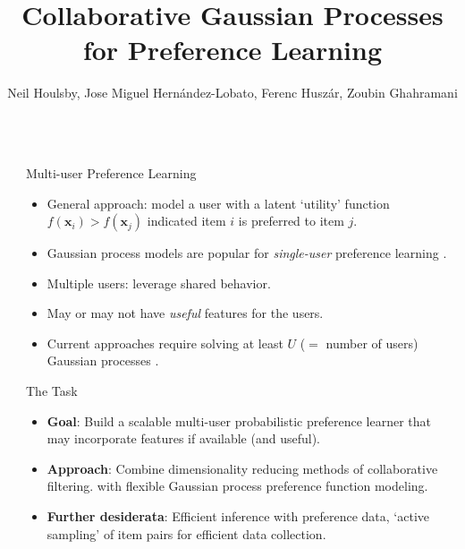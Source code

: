 \documentclass[final]{beamer}
\title{Collaborative Gaussian Processes for Preference Learning}
\author{Neil Houlsby, Jose Miguel Hern\'{a}ndez-Lobato, Ferenc Husz\'{a}r, Zoubin Ghahramani}
\institute{Computational and Biological Learning Lab, Department of Engineering, University of Cambridge}
\newlength{\sepwid}
\newlength{\onecolwid}
\newcommand{\x}{\mathbf{x}}
\begin{document}
\begin{frame}[t]
  \begin{columns}[t]

  \begin{column}{\sepwid}\end{column}         %

  \begin{column}{\onecolwid}

    \begin{block}{Multi-user Preference Learning}
        \begin{itemize}
          \item General approach: model a user with a latent `utility' function $f(\x_i)>f(\x_j)$ indicated item $i$
            is preferred to item $j$.
          \item Gaussian process models are popular for \emph{single-user} preference learning
            \cite{chu2005}.
          \item Multiple users: leverage shared behavior.
          \item May or may not have \emph{useful} features for the users.
          \item Current approaches require solving at least $U$ ($=$ number of users) Gaussian processes \cite{bonilla2010, birlutiu2009}.
        \end{itemize}
      \end{block}

    \begin{alertblock}{The Task}
      \begin{itemize}
        \item {\bf Goal}: Build a scalable multi-user probabilistic preference learner that
            may incorporate features if available (and useful).
        \item {\bf Approach}: Combine dimensionality reducing methods of collaborative filtering.
          with flexible Gaussian process preference function modeling.
        \item {\bf Further desiderata}: Efficient inference with preference data, `active sampling' of item pairs for efficient data collection.
      \end{itemize}
    \end{alertblock}


\end{column}
\end{columns}
\end{frame}
\end{document}
